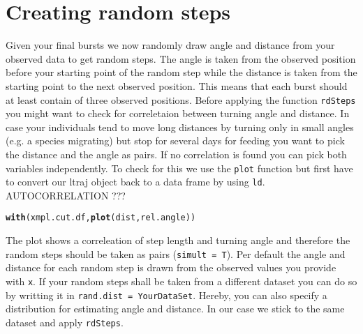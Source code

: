 \documentclass[11pt, a4paper]{article}\usepackage[]{graphicx}\usepackage[]{color}
\makeatletter
\newcommand{\hlstd}[1]{\textcolor[rgb]{0.345,0.345,0.345}{#1}}%
\newcommand{\hlkwd}[1]{\textcolor[rgb]{0.737,0.353,0.396}{\textbf{#1}}}%
\newenvironment{kframe}{%
 \def\at@end@of@kframe{}%
 \ifinner\ifhmode%
  \def\at@end@of@kframe{\end{minipage}}%
  \begin{minipage}{\columnwidth}%
 \fi\fi%
 \def\FrameCommand##1{\hskip\@totalleftmargin \hskip-\fboxsep
 \colorbox{shadecolor}{##1}\hskip-\fboxsep
     \hskip-\linewidth \hskip-\@totalleftmargin \hskip\columnwidth}%
 \MakeFramed {\advance\hsize-\width
   \@totalleftmargin\z@ \linewidth\hsize
   \@setminipage}}%
 {\par\unskip\endMakeFramed%
 \at@end@of@kframe}
\newenvironment{knitrout}{}{} %
\makeatother
\begin{document}

  
  


\section{Creating random steps}

Given your final bursts we now randomly draw angle and distance from your observed data to get random steps. The angle is taken from the observed position before your starting point of the random step while the distance is taken from the starting point to the next observed position. This means that each burst should at least contain of three observed positions. 
Before applying the function \texttt{rdSteps} you might want to check for correletaion between turning angle and distance. In case your individuals tend to move long distances by turning only in small angles (e.g. a species migrating) but stop for several days for feeding you want to pick the distance and the angle as pairs. If no correlation is found you can pick both variables independently.
To check for this we use the \texttt{plot} function but first have to convert our ltraj object back to a data frame by using \texttt{ld}.
AUTOCORRELATION ???

\begin{knitrout}
\color{fgcolor}\begin{kframe}


{\ttfamily\noindent\bfseries{}}\end{kframe}
\end{knitrout}

\begin{knitrout}
\color{fgcolor}\begin{kframe}
\begin{alltt}
\hlkwd{with}\hlstd{(xmpl.cut.df,} \hlkwd{plot}\hlstd{(dist, rel.angle))}
\end{alltt}


{\ttfamily\noindent\bfseries\color{errorcolor}{\#\# Error in with(xmpl.cut.df, plot(dist, rel.angle)): Objekt 'xmpl.cut.df' nicht gefunden}}\end{kframe}
\end{knitrout}

The plot shows a correleation of step length and turning angle and therefore the random steps should be taken as pairs (\texttt{simult = T}). Per default the angle and distance for each random step is drawn from the observed values you provide with \texttt{x}. If your random steps shall be taken from a different dataset you can do so by writting it in \texttt{rand.dist = YourDataSet}. Hereby, you can also specify a distribution for estimating angle and distance. In our case we stick to the same dataset and apply  \texttt{rdSteps}.  
\end{document}
